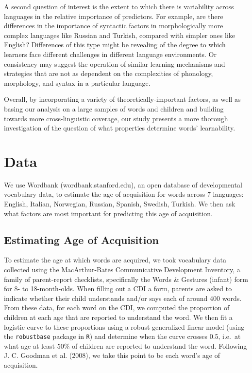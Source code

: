 \documentclass[10pt, letterpaper]{article}
\begin{document}
A second question of interest is the extent to which there is
variability across languages in the relative importance of predictors.
For example, are there differences in the importance of syntactic
factors in morphologically more complex languages like Russian and
Turkish, compared with simpler ones like English? Differences of this
type might be revealing of the degree to which learners face different
challenges in different language environments. Or consistency may
suggest the operation of similar learning mechanisms and strategies that
are not as dependent on the complexities of phonology, morphology, and
syntax in a particular language.

Overall, by incorporating a variety of theoretically-important factors,
as well as basing our analysis on a large samples of words and children
and building towards more cross-linguistic coverage, our study presents
a more thorough investigation of the question of what properties
determine words' learnability.

\section{Data}\label{data}

We use Wordbank (wordbank.stanford.edu), an open database of
developmental vocabulary data, to estimate the age of acquisition for
words across 7 languages: English, Italian, Norwegian, Russian, Spanish,
Swedish, Turkish. We then ask what factors are most important for
predicting this age of acquisition.

\subsection{Estimating Age of
Acquisition}\label{estimating-age-of-acquisition}

To estimate the age at which words are acquired, we took vocabulary data
collected using the MacArthur-Bates Communicative Development Inventory,
a family of parent-report checklists, specifically the Words \& Gestures
(infant) form for 8- to 18-month-olds. When filling out a CDI a form,
parents are asked to indicate whether their child understands and/or
says each of around 400 words. From these data, for each word on the
CDI, we computed the proportion of children at each age that are
reported to understand the word. We then fit a logistic curve to these
proportions using a robust generalized linear model (using the
\texttt{robustbase} package in \texttt{R}) and determine when the curve
crosses 0.5, i.e.~at what age at least 50\% of children are reported to
understand the word. Following J. C. Goodman et al. (2008), we take this
point to be each word's age of acquisition.
\end{document}

